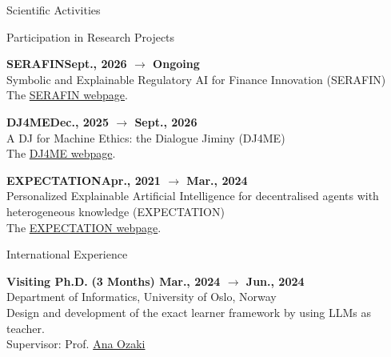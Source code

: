 \documentclass{resume} %
\begin{document}
\begin{rSection}{Scientific Activities}

        \begin{rSubsection2}{Participation in Research Projects}
            \item\textbf{SERAFIN}\hfill \textbf{Sept., 2026 $\rightarrow$ Ongoing}
            \\Symbolic and Explainable Regulatory AI for Finance Innovation (SERAFIN)
            \\The \href{https://icr.uni.lu/luxlogai2025/serafin.html}{SERAFIN webpage}.

            \item\textbf{DJ4ME}\hfill \textbf{Dec., 2025 $\rightarrow$ Sept., 2026}
            \\A DJ for Machine Ethics: the Dialogue Jiminy (DJ4ME)
            \\The \href{https://icr.uni.lu/dj4me/index.html}{DJ4ME webpage}.

            \item\textbf{EXPECTATION}\hfill \textbf{Apr., 2021 $\rightarrow$ Mar., 2024}
            \\Personalized Explainable Artificial Intelligence for decentralised agents with heterogeneous knowledge (EXPECTATION)
            \\The \href{https://expectation.ehealth.hevs.ch/posts/home/}{EXPECTATION webpage}.
        \end{rSubsection2}



        \begin{rSubsection2}{International Experience}

            \item\textbf{ Visiting Ph.D. }\hfill \textbf{(3 Months) Mar., 2024 $\rightarrow$ Jun., 2024}
            \\Department of Informatics, University of Oslo, Norway
            \\Design and development of the exact learner framework by using LLMs as teacher.
            \\Supervisor: Prof. \href{mailto:anaoz@ifi.uio.no}{Ana Ozaki}


\end{rSubsection2}
\end{rSection}
\end{document}
